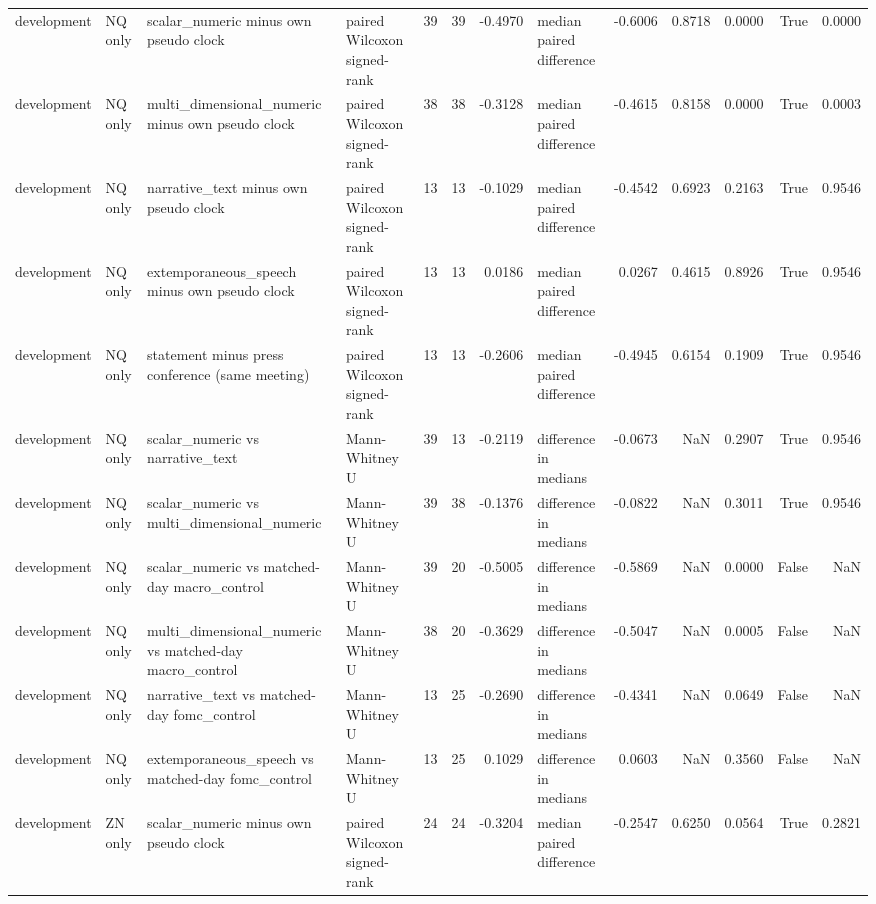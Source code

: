 \begin{tabular}{llllrrrlrrrrr}
development & NQ only & scalar_numeric minus own pseudo clock & paired Wilcoxon signed-rank & 39 & 39 & -0.4970 & median paired difference & -0.6006 & 0.8718 & 0.0000 & True & 0.0000 \\
development & NQ only & multi_dimensional_numeric minus own pseudo clock & paired Wilcoxon signed-rank & 38 & 38 & -0.3128 & median paired difference & -0.4615 & 0.8158 & 0.0000 & True & 0.0003 \\
development & NQ only & narrative_text minus own pseudo clock & paired Wilcoxon signed-rank & 13 & 13 & -0.1029 & median paired difference & -0.4542 & 0.6923 & 0.2163 & True & 0.9546 \\
development & NQ only & extemporaneous_speech minus own pseudo clock & paired Wilcoxon signed-rank & 13 & 13 & 0.0186 & median paired difference & 0.0267 & 0.4615 & 0.8926 & True & 0.9546 \\
development & NQ only & statement minus press conference (same meeting) & paired Wilcoxon signed-rank & 13 & 13 & -0.2606 & median paired difference & -0.4945 & 0.6154 & 0.1909 & True & 0.9546 \\
development & NQ only & scalar_numeric vs narrative_text & Mann-Whitney U & 39 & 13 & -0.2119 & difference in medians & -0.0673 & NaN & 0.2907 & True & 0.9546 \\
development & NQ only & scalar_numeric vs multi_dimensional_numeric & Mann-Whitney U & 39 & 38 & -0.1376 & difference in medians & -0.0822 & NaN & 0.3011 & True & 0.9546 \\
development & NQ only & scalar_numeric vs matched-day macro_control & Mann-Whitney U & 39 & 20 & -0.5005 & difference in medians & -0.5869 & NaN & 0.0000 & False & NaN \\
development & NQ only & multi_dimensional_numeric vs matched-day macro_control & Mann-Whitney U & 38 & 20 & -0.3629 & difference in medians & -0.5047 & NaN & 0.0005 & False & NaN \\
development & NQ only & narrative_text vs matched-day fomc_control & Mann-Whitney U & 13 & 25 & -0.2690 & difference in medians & -0.4341 & NaN & 0.0649 & False & NaN \\
development & NQ only & extemporaneous_speech vs matched-day fomc_control & Mann-Whitney U & 13 & 25 & 0.1029 & difference in medians & 0.0603 & NaN & 0.3560 & False & NaN \\
development & ZN only & scalar_numeric minus own pseudo clock & paired Wilcoxon signed-rank & 24 & 24 & -0.3204 & median paired difference & -0.2547 & 0.6250 & 0.0564 & True & 0.2821 \\

\end{tabular}
